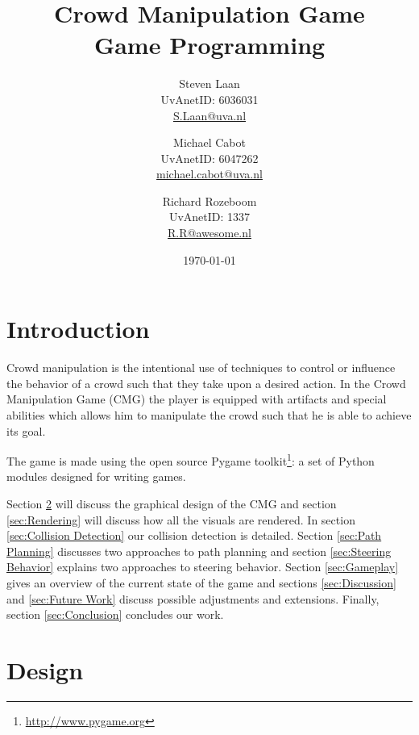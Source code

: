 \documentclass[a4paper,pdf,12pt]{article}
\title{Crowd Manipulation Game\\ \normalsize{Game Programming}}
\author{Steven Laan\\UvAnetID: 6036031\\\url{S.Laan@uva.nl} \and Michael Cabot\\UvAnetID: 6047262\\\url{michael.cabot@uva.nl} \and Richard Rozeboom\\UvAnetID: 1337\\\url{R.R@awesome.nl}}
\date{\today}
\begin{document}
\maketitle

\section{Introduction}
Crowd manipulation is the intentional use of techniques to control or influence the behavior of a crowd such that they take upon a desired action. In the Crowd Manipulation Game (CMG) the player is equipped with artifacts and special abilities which allows him to manipulate the crowd such that he is able to achieve its goal.

The game is made using the open source Pygame toolkit\footnote{\url{http://www.pygame.org}}: a set of Python modules designed for writing games.

Section \ref{sec:Design} will discuss the graphical design of the CMG and section \ref{sec:Rendering} will discuss how all the visuals are rendered. In section \ref{sec:Collision Detection} our collision detection is detailed. Section \ref{sec:Path Planning} discusses two approaches to path planning and section \ref{sec:Steering Behavior} explains two approaches to steering behavior. Section \ref{sec:Gameplay} gives an overview of the current state of the game and sections \ref{sec:Discussion} and \ref{sec:Future Work} discuss possible adjustments and extensions. Finally, section \ref{sec:Conclusion} concludes our work.

\section{Design}
\label{sec:Design}
\end{document}
